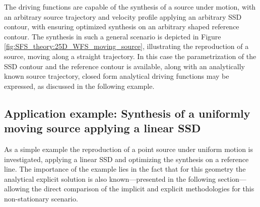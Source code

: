 The driving functions are capable of the synthesis of a source under motion, with an arbitrary source trajectory and velocity profile applying an arbitrary SSD contour, with ensuring optimized synthesis on an arbitrary shaped reference contour.
The synthesis in such a general scenario is depicted in Figure \ref{fig:SFS_theory:25D_WFS_moving_source}, illustrating the reproduction of a source, moving along a straight trajectory.
In this case the parametrization of the SSD contour and the reference contour is available, along with an analytically known source trajectory, closed form analytical driving functions may be expressed, as discussed in the following example.

\subsection*{Application example: Synthesis of a uniformly moving source applying a linear SSD}

As a simple example the reproduction of a point source under uniform motion is investigated, applying a linear SSD and optimizing the synthesis on a reference line.
The importance of the example lies in the fact that for this geometry the analytical explicit solution is also known---presented in the following section---allowing the direct comparison of the implicit and explicit methodologies for this non-stationary scenario.

